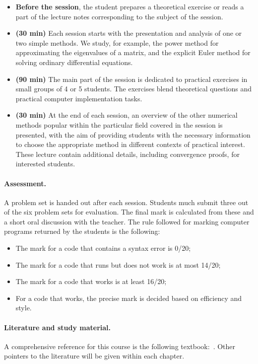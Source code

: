 \begin{itemize}
    \itemsep1em
    \item
        \textbf{Before the session}, the student prepares a theoretical exercise or
        reads a part of the lecture notes corresponding to the subject of the session.

    \item
        \textbf{(30 min)}
        Each session starts with the presentation and analysis of one or two simple methods.
        We study, for example,
        the power method for approximating the eigenvalues of a matrix,
        and the explicit Euler method for solving ordinary differential equations.

    \item
        \textbf{(90 min)}
        The main part of the session is dedicated to practical exercises in small groups of 4 or 5 students.
        The exercises blend theoretical questions and practical computer implementation tasks.

    \item
        \textbf{(30 min)}
        At the end of each session,
        an overview of the other numerical methods popular within the particular field covered in the session is presented,
        with the aim of providing students with the necessary information to choose the appropriate method in different contexts of practical interest.
        These lecture contain additional details,
        including convergence proofs, for interested students.
\end{itemize}

\paragraph{Assessment.}%
\label{par:assessment}
A problem set is handed out after each session.
Students much submit three out of the six problem sets for evaluation.
The final mark is calculated from these and a short oral discussion with the teacher.
The rule followed for marking computer programs returned by the students is the following:
\begin{itemize}
    \item The mark for a code that contains a syntax error is 0/20;
    \item The mark for a code that runs but does not work is at most 14/20;
    \item The mark for a code that works is at least 16/20;
    \item For a code that works, the precise mark is decided based on efficiency and style.
\end{itemize}

\paragraph{Literature and study material.}%
A comprehensive reference for this course is the following textbook:~.
Other pointers to the literature will be given within each chapter.
